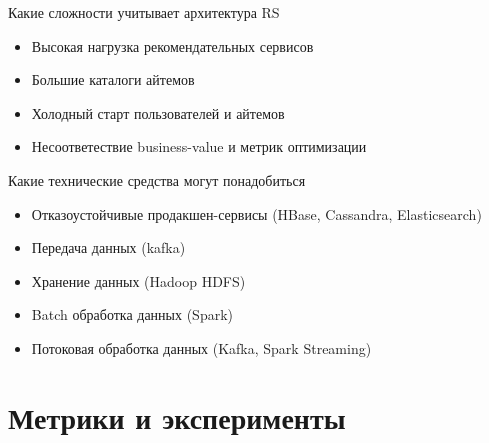 \documentclass[11pt,aspectratio=169]{beamer}
\begin{document}
\begin{frame}{Какие сложности учитывает архитектура RS}

\begin{itemize}
\item Высокая нагрузка рекомендательных сервисов
\item Большие каталоги айтемов
\item Холодный старт пользователей и айтемов
\item Несоответествие business-value и метрик оптимизации
\end{itemize}

\end{frame}

\begin{frame}{Какие технические средства могут понадобиться}

\begin{itemize}
\item Отказоустойчивые продакшен-сервисы (HBase, Cassandra, Elasticsearch)
\item Передача данных (kafka)
\item Хранение данных (Hadoop HDFS)
\item Batch обработка данных (Spark)
\item Потоковая обработка данных (Kafka, Spark Streaming)
\end{itemize}

\end{frame}

\section{Метрики и эксперименты}
\end{document}
